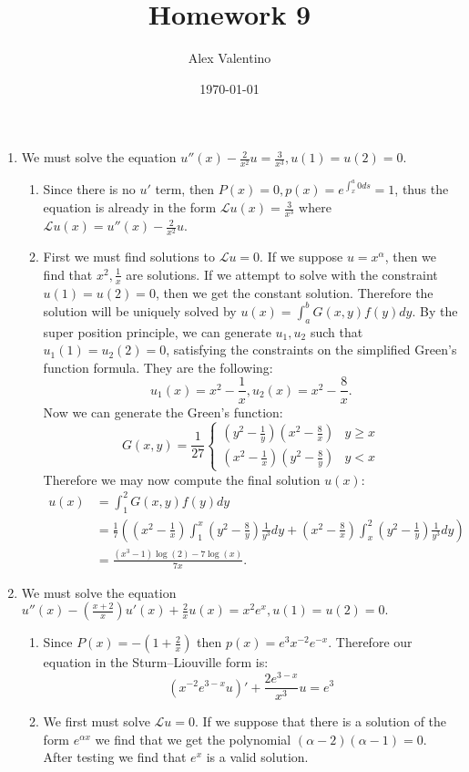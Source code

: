 \documentclass[12pt, letterpaper]{article}
\date{\today}
\author{Alex Valentino}
\title{Homework 9}
\begin{document}
	\begin{enumerate}
		\item We must solve the equation $u''(x) - \frac{2}{x^2} u = \frac{3}{x^3}, u(1) = u(2) = 0.$  
		\begin{enumerate}
			\item Since there is no $u'$ term, then $P(x) = 0, p(x) = e^{\int_x^a 0 ds} = 1$, thus the equation is already in the form $\mathcal{L} u(x) = \frac{3}{x^3}$ where $\mathcal{L} u(x) = u''(x) - \frac{2}{x^2} u$.  
			\item First we must find solutions to $\mathcal{L} u = 0$.  If we suppose $u = x^\alpha$, then we find that $x^2, \frac{1}{x}$ are solutions.  If we attempt to solve with the constraint $u(1) = u(2) = 0$, then we get the constant solution.  Therefore the solution will be uniquely solved by $u(x) = \int_a^b G(x,y) f(y) dy$. By the super position principle, we can generate $u_1, u_2$ such that $u_1 (1) = u_2 (2) = 0$, satisfying the constraints on the simplified Green's function formula.  They are the following:
			$$
			u_1(x) = x^2 - \frac{1}{x},u_2(x) = x^2 -\frac{8}{x}.
			$$   
			Now we can generate the Green's function:
			$$
				G(x,y) = \frac{1}{27} \begin{cases}
					(y^2 - \frac{1}{y})(x^2-\frac{8}{x}) & y \geq x\\
		(x^2 - \frac{1}{x})(y^2-\frac{8}{y}) & y < x			
				\end{cases}
			$$
			Therefore we may now compute the final solution $u(x)$:
			\begin{align*}
			u(x) &= \int_1^2 G(x,y) f(y) dy \\
			&= \frac{1}{7} \left(\left(x^2-\frac{1}{x}\right)\int_1^x \left(y^2 - \frac{8}{y}\right)\frac{1}{y^3}dy +  \left(x^2-\frac{8}{x} \right) \int_x^2 \left(y^2 - \frac{1}{y} \right)\frac{1}{y^3}dy\right)  \\
			&= \frac{\left(x^3-1\right) \log (2)-7 \log (x)}{7 x}.
			\end{align*}
		\end{enumerate}
		\item We must solve the equation $ u''(x) -  (\frac{x+2}{x})u'(x) + \frac{2}{x} u(x) = x^2 e^x, u(1) = u(2) = 0.$
		\begin{enumerate}
			\item Since $P(x) = -(1 + \frac{2}{x})$ then $p(x) = e^3 x^{-2} e^{-x} $.  Therefore our equation in the Sturm–Liouville form is:
			$$
			( x^{-2} e^{3-x} u)' + \frac{2e^{3-x}}{x^3}u = e^3
			$$
			\item We first must solve $\mathcal{L} u = 0$.  If we suppose that there is a solution of the form $e^{\alpha x}$ we find that we get the polynomial $(\alpha - 2)(\alpha - 1) = 0$.  After testing we find that $e^x$ is a valid solution.  

\end{enumerate}
\end{enumerate}
\end{document}

